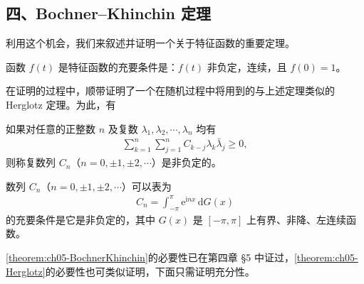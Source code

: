 \documentclass[../../main.tex]{subfiles}
\begin{document}
\subsection*{四、Bochner--Khinchin 定理}

利用这个机会，我们来叙述并证明一个关于特征函数的重要定理。

\begin{theorem}\label{theorem:ch05-BochnerKhinchin}
函数 $f(t)$ 是特征函数的充要条件是：$f(t)$ 非负定，连续，且 $f(0)=1$。
\end{theorem}

在证明的过程中，顺带证明了一个在随机过程中将用到的与上述定理类似的 Herglotz 定理。为此，有

\begin{definition}[非负定复数列]\label{definition:ch05-非负定数列}
如果对任意的正整数 $n$ 及复数 $\lambda_1,\lambda_2,\cdots,\lambda_n$ 均有
\begin{align}
\sum_{k=1}^{n}\sum_{j=1}^{n}C_{k-j}\lambda_k\bar{\lambda}_j\geqslant0,
\end{align}
则称复数列 $C_n$（$n=0,\pm1,\pm2,\cdots$）是非负定的。
\end{definition}

\begin{theorem}[Herglotz]\label{theorem:ch05-Herglotz}
数列 $C_n$（$n=0,\pm1,\pm2,\cdots$）可以表为
\begin{align}
C_n=\int_{-\pi}^{\pi}\mathrm{e}^{\mathrm{i}nx}\,\mathrm{d}G(x)
\end{align}
的充要条件是它是非负定的，其中 $G(x)$ 是 $[-\pi,\pi]$ 上有界、非降、左连续函数。
\end{theorem}

\cref{theorem:ch05-BochnerKhinchin}的必要性已在第四章 \S5 中证过，\cref{theorem:ch05-Herglotz}的必要性也可类似证明，下面只需证明充分性。
\end{document}
